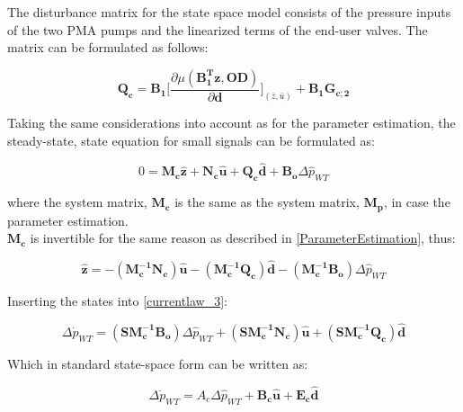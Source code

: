 The disturbance matrix for the state space model consists of the pressure inputs of the two PMA pumps and the linearized terms of the end-user valves. The matrix can be formulated as follows: 

\begin{equation}
  \pmb{Q_c} = \pmb{B_1} \bigg[ \frac{\partial{\mu(\pmb{{B_1^{T}}}\pmb{z}, \pmb{OD})}}{{\partial{\pmb{d}}}}  \bigg]_{(\bar{z}, \bar{u})} + \pmb{B_1}\pmb{G_{c;2}}  
\label{disturbance_matrix}
\end{equation}

Taking the same considerations into account as for the parameter estimation, the steady-state, state equation for small signals can be formulated as: 

 \begin{equation}
 0 = \pmb{M_c} \pmb{\hat{z}} + \pmb{N_c} \pmb{\hat{u}} + \pmb{Q_c} \pmb{\hat{d}} + \pmb{B_o} \Delta \hat{p}_{WT}    
 \label{statespace_control_sys}
\end{equation}

where the system matrix, $\pmb{M_c}$ is the same as the system matrix, $\pmb{M_p}$, in case the parameter estimation. 
\\
$\pmb{M_c}$ is invertible for the same reason as described in \eqref{ParameterEstimation}, thus:

 \begin{equation}
 \pmb{\hat{z}} =  - (\pmb{M_c^{-1}}\pmb{N_c}) \pmb{\hat{u}} - (\pmb{M_c^{-1}}\pmb{Q_c}) \pmb{\hat{d}} - (\pmb{M_c^{-1}}\pmb{B_o}) \Delta \hat{p}_{WT}    
 \label{statespace_control_sys_state}
\end{equation}

Inserting the states into \eqref{currentlaw_3}:

 \begin{equation}
\Delta \dot{p}_{WT} = (\pmb{S}\pmb{M_c^{-1}}\pmb{B_o}) \Delta \hat{p}_{WT}  + (\pmb{S}\pmb{M_c^{-1}}\pmb{N_c}) \pmb{\hat{u}} + (\pmb{S}\pmb{M_c^{-1}}\pmb{Q_c}) \pmb{\hat{d}} 
 \label{statespace_control_sys_state_1}
\end{equation}

Which in standard state-space form can be written as: 

 \begin{equation}
\Delta \dot{p}_{WT} = A_c \Delta \hat{p}_{WT}  + \pmb{B_c} \pmb{\hat{u}} + \pmb{E_c} \pmb{\hat{d}} 
 \label{statespace_control_sys_state_2}
\end{equation}

